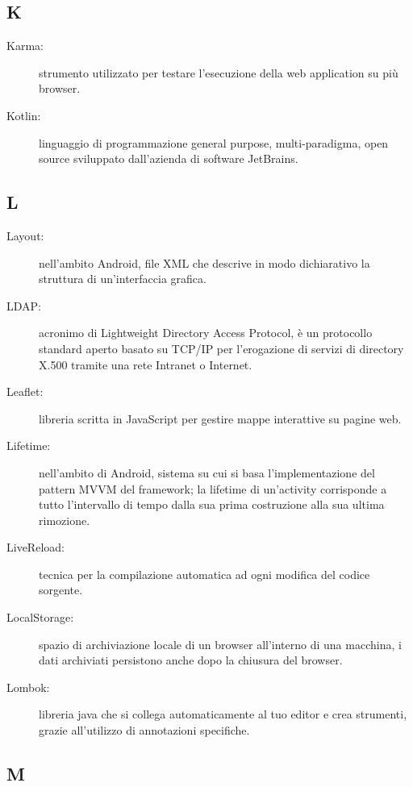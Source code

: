 \documentclass[../manuale-manutentore.tex]{subfiles}
\begin{document}
\subsection{K}

\begin{description}
    \item[Karma:] strumento utilizzato per testare l'esecuzione della web application su più browser.
    \item[Kotlin:] linguaggio di programmazione general purpose, multi-paradigma, open source sviluppato dall'azienda di software JetBrains.
\end{description}

\subsection{L}

\begin{description}
    \item[Layout:] nell'ambito Android, file XML che descrive in modo dichiarativo la struttura di un'interfaccia grafica.
    \item[LDAP:] acronimo di Lightweight Directory Access Protocol, è un protocollo standard aperto basato su TCP/IP per l'erogazione di servizi di directory X.500 tramite una rete Intranet o Internet.
    \item[Leaflet:] libreria scritta in JavaScript per gestire mappe interattive su pagine web.
    \item[Lifetime:] nell'ambito di Android, sistema su cui si basa l'implementazione del pattern MVVM del framework; la lifetime di un'activity corrisponde a tutto l'intervallo di tempo dalla sua prima costruzione alla sua ultima rimozione.
    \item[LiveReload:] tecnica per la compilazione automatica ad ogni modifica del codice sorgente.
    \item[LocalStorage:] spazio di archiviazione locale di un browser all'interno di una macchina, i dati archiviati persistono anche dopo la chiusura del browser.
    \item[Lombok:] libreria java che si collega automaticamente al tuo editor e crea strumenti, grazie all'utilizzo di annotazioni specifiche.
\end{description}

\subsection{M}
\end{document}
